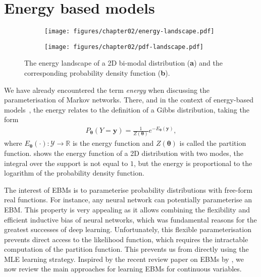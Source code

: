 \section{Energy based models}
\begin{figure*}
  \centering
  \begin{subfigure}{.48\textwidth}
    \centering
    \texttt{[image: figures/chapter02/energy-landscape.pdf]}
    \caption{}
    \label{fig:Energy}
  \end{subfigure}
  \begin{subfigure}{.48\textwidth}
    \centering
    \texttt{[image: figures/chapter02/pdf-landscape.pdf]}
    \caption{}
    \label{fig:pdf}
  \end{subfigure}
  \caption{The energy landscape of a 2D bi-modal distribution (\textbf{a}) and the corresponding probability density function (\textbf{b}).}
\end{figure*}
We have already encountered the term \textit{energy} when discussing the parameterisation of Markov networks. There, and in the context of energy-based models~\citep[][EBMs]{teh2003energy}, the energy relates to the definition of a Gibbs distribution, taking the form
\begin{align}
  P_{\bm{\theta}}(Y=\bm{y}) = \frac{1}{Z(\bm{\theta})} e^{-E_{\bm{\theta}}(\bm{y})},
\end{align}
where $E_{\bm{\theta}}(\cdot): \mathcal{Y}\rightarrow \mathbb{R}$ is the energy function and $Z(\bm{\theta})$ is called the partition function.  shows the energy function of a 2D distribution with two modes, the integral over the support is not equal to $1$, but the energy is proportional to the logarithm of the probability density function.

The interest of EBMs is to parameterise probability distributions with free-form real functions. For instance, any neural network can potentially parameterise an EBM. This property is very appealing as it allows combining the flexibility and efficient inductive bias of neural networks, which was fundamental reasons for the greatest successes of deep learning. Unfortunately, this flexible parameterisation prevents direct access to the likelihood function, which requires the intractable computation of the partition function. This prevents us from directly using the MLE learning strategy. Inspired by the recent review paper on EBMs by \citet{song2021train}, we now review the main approaches for learning EBMs for continuous variables.

